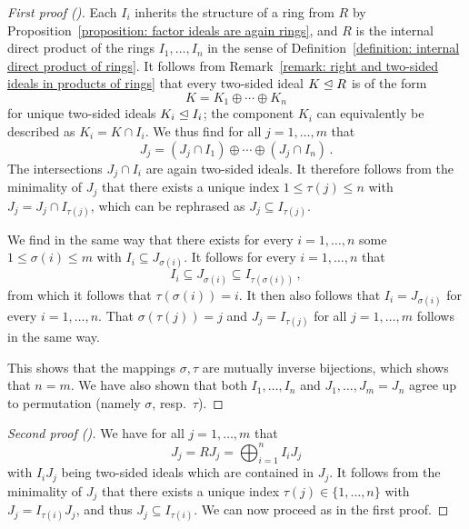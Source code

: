 \begin{proof}[First proof ({\cite[Lemma~3.8]{Lam1991First}})]
  Each $I_i$ inherits the structure of a ring from $R$ by Proposition~\ref{proposition: factor ideals are again rings}, and $R$ is the internal direct product of the rings $I_1, \dotsc, I_n$ in the sense of Definition~\ref{definition: internal direct product of rings}.
  It follows from Remark~\ref{remark: right and two-sided ideals in products of rings} that every two-sided ideal $K \trianglelefteq R$ is of the form
  \[
    K = K_1 \oplus \dotsb \oplus K_n
  \]
  for unique two-sided ideals $K_i \trianglelefteq I_i$;
  the component $K_i$ can equivalently be described as $K_i = K \cap I_i$.
  We thus find for all $j = 1, \dotsc, m$ that
  \[
    J_j = (J_j \cap I_1) \oplus \dotsb \oplus (J_j \cap I_n) \,.
  \]
  The intersections $J_j \cap I_i$ are again two-sided ideals.
  It therefore follows from the minimality of $J_j$ that there exists a unique index $1 \leq \tau(j) \leq n$ with $J_j = J_j \cap I_{\tau(j)}$, which can be rephrased as $J_j \subseteq I_{\tau(j)}$.
  
  We find in the same way that there exists for every $i = 1, \dotsc, n$ some $1 \leq \sigma(i) \leq m$ with $I_i \subseteq J_{\sigma(i)}$.
  It follows for every $i = 1, \dotsc, n$ that
  \[
              I_i
    \subseteq J_{\sigma(i)}
    \subseteq I_{\tau(\sigma(i))} \,,
  \]
  from which it follows that $\tau(\sigma(i)) = i$.
  It then also follows that $I_i = J_{\sigma(i)}$ for every $i = 1, \dotsc, n$.
  That $\sigma(\tau(j)) = j$ and $J_j = I_{\tau(j)}$ for all $j = 1, \dotsc, m$ follows in the same way.
  
  This shows that the mappings $\sigma, \tau$ are mutually inverse bijections, which shows that $n = m$.
  We have also shown that both $I_1, \dotsc, I_n$ and $J_1, \dotsc, J_m = J_n$ agree up to permutation (namely $\sigma$, resp.\ $\tau$).
\end{proof}


\begin{proof}[Second proof ({\cite[Theorem~1.13]{FarbDennis1993}})]
  We have for all $j = 1, \dotsc, m$ that
  \[
      J_j
    = R J_j
    = \bigoplus_{i=1}^n I_i J_j    
  \]
  with $I_i J_j$ being two-sided ideals which are contained in $J_j$.
  It follows from the minimality of $J_j$ that there exists a unique index $\tau(j) \in \{1, \dotsc, n\}$  with $J_j = I_{\tau(i)} J_j$, and thus $J_j \subseteq I_{\tau(i)}$.
  We can now proceed as in the first proof.
\end{proof}


